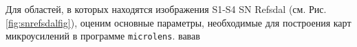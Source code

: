 Для областей, в которых находятся изображения S1-S4 SN Refsdal (см. Рис. \ref{fig:snrefsdalfig}), оценим основные параметры, необходимые для построения карт микроусилений в программе {\tt{microlens}}. вавав